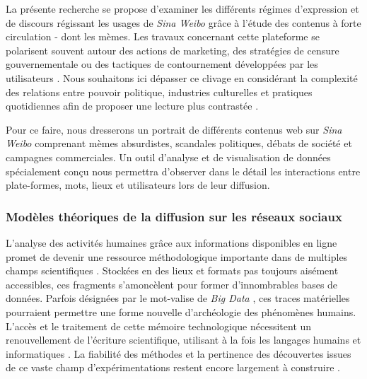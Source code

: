 La présente recherche se propose d'examiner les différents régimes d'expression et de discours régissant les usages de \textit{Sina Weibo} grâce à l'étude des contenus à forte circulation - dont les mèmes. Les travaux concernant cette plateforme se polarisent souvent autour des actions de marketing, des stratégies de censure gouvernementale \citep{Ng2013a} ou des tactiques de contournement développées par les utilisateurs \citep{Yang2014}. Nous souhaitons ici dépasser ce clivage en considérant la complexité des relations entre pouvoir politique, industries culturelles et pratiques quotidiennes afin de proposer une lecture plus contrastée \citep{Fernandez2010}.

Pour ce faire, nous dresserons un portrait de différents contenus web sur \textit{Sina Weibo} comprenant mèmes absurdistes, scandales politiques, débats de société et campagnes commerciales. Un outil d'analyse et de visualisation de données spécialement conçu 
nous permettra d'observer dans le détail les interactions entre plate-formes, mots, lieux et utilisateurs lors de leur diffusion.


\subsubsection{Modèles théoriques de la diffusion sur les réseaux sociaux}

L'analyse des activités humaines grâce aux informations disponibles en ligne promet de devenir une ressource méthodologique importante dans de multiples champs scientifiques \citep{Schreibman2007}. Stockées en des lieux et formats pas toujours aisément accessibles, ces fragments s'amoncèlent pour former d'innombrables bases de données. Parfois désignées par le mot-valise de \textit{Big Data} \citep{Lohr2012a}, ces traces matérielles pourraient permettre une forme nouvelle d'archéologie des phénomènes humains. L'accès et le traitement de cette mémoire technologique nécessitent un renouvellement de l'écriture scientifique, utilisant à la fois les langages humains et informatiques \citep{ Guichard2014}. La fiabilité des méthodes et la pertinence des découvertes issues de ce vaste champ d'expérimentations restent encore largement à construire \citep{Boyd2011}.

